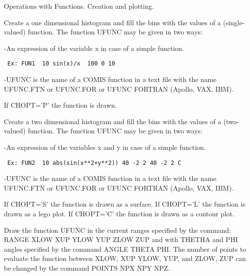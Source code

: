 \BEGTEXT
Operations with Functions. Creation and plotting.
\ENDTEXT

\BEGARG
{}
\ENDARG
\BEGTEXT
Create a one dimensional histogram and fill the bins with the
values of a (single-valued) function.
The function UFUNC may be given in two ways:

-An expression of the variable x in case of a simple function.
\begin{verbatim}
 Ex: FUN1  10 sin(x)/x  100 0 10
\end{verbatim}
-UFUNC is the name of a COMIS function in a text file with the
name UFUNC.FTN or UFUNC.FOR or UFUNC FORTRAN (Apollo, VAX, IBM).

If CHOPT='P' the function is drawn.
\ENDTEXT

\BEGARG
{}
\ENDARG
\BEGTEXT
Create a two dimensional histogram and fill
the bins with the values of a (two-valued) function.
The function UFUNC may be given in two ways:

-An expression of the variables x and y in case of a simple function.
\begin{verbatim}
 Ex: FUN2  10 abs(sin(x**2+y**2)) 40 -2 2 40 -2 2 C
\end{verbatim}
-UFUNC is the name of a COMIS function in a text file with the
name UFUNC.FTN or UFUNC.FOR or UFUNC FORTRAN (Apollo, VAX, IBM).

If CHOPT='S' the function is drawn as a surface.
If CHOPT='L' the function is drawn as a lego plot.
If CHOPT='C' the function is drawn as a contour plot.
\ENDTEXT

\BEGARG
{}
\ENDARG
\BEGTEXT
Draw the function UFUNC
in the current ranges specified by the command:
RANGE XLOW XUP YLOW YUP ZLOW ZUP and with THETHA and PHI angles specified
by the command ANGLE THETA PHI. The number of points to evaluate the function
between XLOW, XUP YLOW, YUP, and ZLOW, ZUP can be changed by the command
POINTS NPX NPY NPZ.

